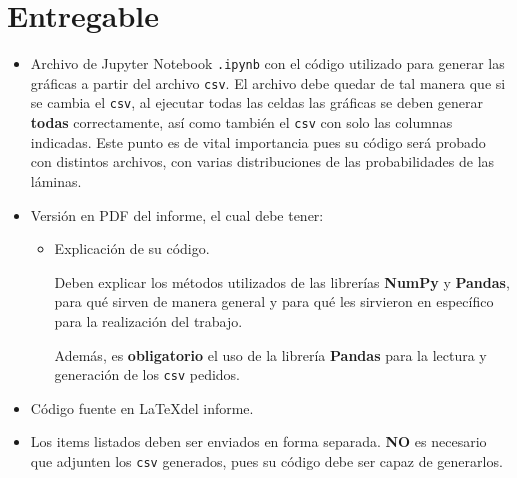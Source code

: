 \newpage

\section*{Entregable}

\begin{itemize}
    \item Archivo de Jupyter Notebook \texttt{.ipynb} con el código utilizado para generar las gráficas a partir del archivo \texttt{csv}.
     El archivo debe quedar de tal manera que si se cambia el \texttt{csv}, al ejecutar todas las celdas las gráficas se deben generar \textbf{todas} correctamente, así como también el \texttt{csv} con solo las columnas indicadas. Este punto es de vital importancia pues su código será probado con distintos archivos, con varias distribuciones de las probabilidades de las láminas.    \item Versión en PDF del informe,  el cual debe tener:
    \begin{itemize}
        \item Explicación de su código. 

        Deben explicar los métodos utilizados de las librerías \textbf{NumPy} y \textbf{Pandas}, para qué sirven de manera general y para qué les sirvieron en específico para la realización del trabajo.

        Además, es \textbf{obligatorio} el uso de la librería \textbf{Pandas} para la lectura y generación de los \texttt{csv} pedidos. 
    \end{itemize}
    \item Código fuente en \LaTeX  del informe.

    \item Los items listados deben ser enviados en forma separada. \textbf{NO} es necesario que adjunten los \texttt{csv} generados, pues su código debe ser capaz de generarlos.
\end{itemize}
